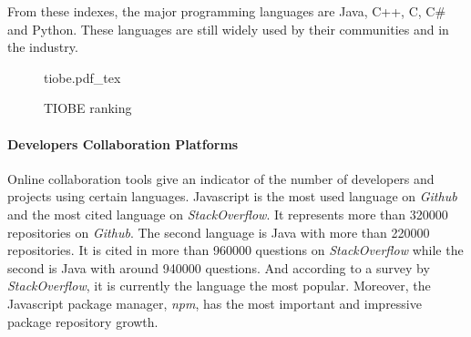 From these indexes, the major programming languages are Java, C++, C, C\# and Python.
These languages are still widely used by their communities and in the industry.


\begin{figure}
    \centering
    \small
    \def\svgwidth{0.9\columnwidth}
    {tiobe.pdf_tex}
    \label{fig:tiobe}
    \caption{TIOBE ranking}
\end{figure}

\paragraph{Developers Collaboration Platforms}

Online collaboration tools give an indicator of the number of developers and projects using certain languages.
Javascript is the most used language on \textit{Github} and the most cited language on \textit{StackOverflow}.
It represents more than \num{320000} repositories on \textit{Github}.
The second language is Java with more than \num{220000} repositories.
It is cited in more than \num{960000} questions on \textit{StackOverflow} while the second is Java with around \num{940000} questions.
And according to a survey by \textit{StackOverflow}, it is currently the language the most popular.
Moreover, the Javascript package manager, \textit{npm}, has the most important and impressive package repository growth.




